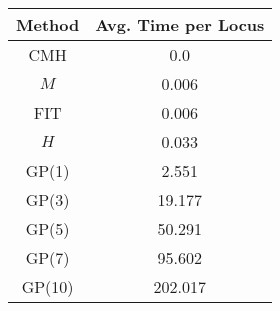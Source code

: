 \centering \begin{tabular}{c|c}
Method	&Avg. Time per Locus\\\hline
CMH	&0.0\\
$M$	&0.006\\
FIT	&0.006\\
$H$	&0.033\\
GP(1)	&2.551\\
GP(3)	&19.177\\
GP(5)	&50.291\\
GP(7)	&95.602\\
GP(10)	&202.017\\
\end{tabular}
